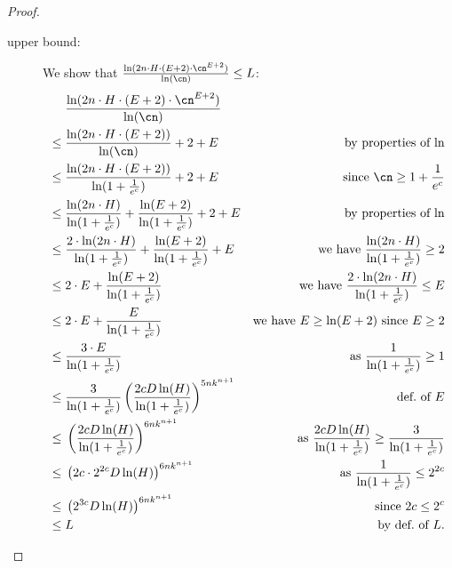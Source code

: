 \begin{proof}
        \begin{description}
          \item[upper bound:] We show that $\frac{\ln(2n \cdot H \cdot (E+2) \cdot \cn^{E+2})}{\ln(\cn)} \leq L$:
          \begin{align*} 
            &  \frac{\ln(2n \cdot H \cdot (E+2) \cdot \cn^{E+2})}{\ln(\cn)}\\ 
            \leq{}& 
                \frac{\ln(2n \cdot H \cdot (E+2))}{\ln(\cn)} + 2 + E
            & \text{by properties of $\ln$}\\
            \leq{}& \frac{\ln(2n \cdot H \cdot (E+2))}{\ln(1+\frac{1}{e^c})} + 2 + E
            & \text{since $\cn \geq 1 + \frac{1}{e^c} $}\\
            \leq{}& \frac{\ln(2n \cdot H)}{\ln(1+\frac{1}{e^c})} + \frac{\ln(E+2)}{\ln(1+\frac{1}{e^c})} + 2 + E
            & \text{by properties of $\ln$}\\
            \leq{}& \frac{2 \cdot \ln(2n \cdot H)}{\ln(1+\frac{1}{e^c})} + \frac{\ln(E+2)}{\ln(1+\frac{1}{e^c})} + E
            & \text{we have $\frac{\ln(2n \cdot H)}{\ln(1+\frac{1}{e^c})} \geq 2$}\\
            \leq{}& 2 \cdot E + \frac{\ln(E+2)}{\ln(1+\frac{1}{e^c})}
            & \text{we have $\frac{2 \cdot \ln(2n \cdot H)}{\ln(1+\frac{1}{e^c})} \leq E$}\\
            \leq{}& 2 \cdot E + \frac{E}{\ln(1+\frac{1}{e^c})}
            & \text{we have $E \geq \ln(E+2)$ since $E \geq 2$}\\
            \leq{}& \frac{3 \cdot E}{\ln(1+\frac{1}{e^c})}
            & \text{as $\frac{1}{\ln(1+\frac{1}{e^c})} \geq 1$}\\
            \leq{}& \frac{3}{\ln(1+\frac{1}{e^c})} \left(\frac{2cD\ln(H)}{\ln(1 + \frac{1}{e^c})}\right)^{5nk^{n+1}}
            & \text{def.~of~$E$}\\
            \leq{}& \left(\frac{2cD\ln(H)}{\ln(1 + \frac{1}{e^c})}\right)^{6nk^{n+1}}
            & \text{as $\frac{2cD\ln(H)}{\ln(1 + \frac{1}{e^c})} \geq \frac{3}{\ln(1+\frac{1}{e^c})}$}\\
            \leq{}& \left(2c \cdot 2^{2c}D\ln(H)\right)^{6nk^{n+1}}
            & \text{as $\frac{1}{\ln(1 + \frac{1}{e^c})} \leq 2^{2c}$}\\
            \leq{}& \left(2^{3c}D\ln(H)\right)^{6nk^{n+1}}
            & \text{since $2c \leq 2^c$}\\
            \leq{}& L 
            & \text{by def.~of $L$}.
          \end{align*}

\end{description}
\end{proof}
